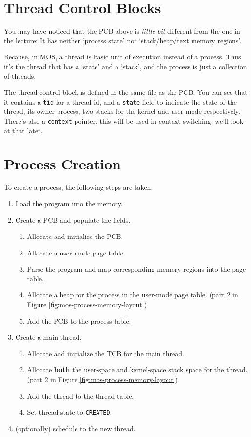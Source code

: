 \section{Thread Control Blocks}

You may have noticed that the PCB above is \textit{little bit} different from the one in the
lecture: It has neither `process state' nor `stack/heap/text memory regions'.

Because, in MOS, a thread is basic unit of execution instead of a process. Thus it's the thread that has a
`state' and a `stack', and the process is just a collection of threads.

The thread control block is defined in the same file as the PCB. You can see that it contains
a \texttt{tid} for a thread id, and a \texttt{state} field to indicate the state of the thread,
its owner process, two stacks for the kernel and user mode respectively. There's also a
\texttt{context} pointer, this will be used in context switching, we'll look at that later.

\section{Process Creation}

To create a process, the following steps are taken:

\begin{enumerate}
    \item Load the program into the memory.
    \item Create a PCB and populate the fields.
          \begin{enumerate}
              \item Allocate and initialize the PCB.
              \item Allocate a user-mode page table.
              \item Parse the program and map corresponding memory regions into the page table.
              \item Allocate a heap for the process in the user-mode page table.
                    (part 2 in Figure \ref{fig:mos-process-memory-layout})
              \item Add the PCB to the process table.
          \end{enumerate}
    \item Create a main thread.
          \begin{enumerate}
              \item Allocate and initialize the TCB for the main thread.
              \item Allocate \textbf{both} the user-space and kernel-space stack space for the thread.
                    (part 2 in Figure \ref{fig:mos-process-memory-layout})
              \item Add the thread to the thread table.
              \item Set thread state to \texttt{CREATED}.
          \end{enumerate}
    \item (optionally) schedule to the new thread.
\end{enumerate}


